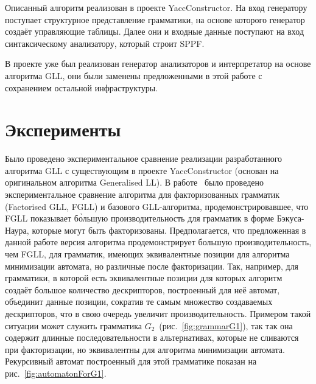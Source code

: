 \documentclass[14pt]{matmex-diploma-custom}
\begin{document}
    Описанный алгоритм реализован в проекте YaccConstructor. 
    На вход генератору поступает структурное представление грамматики, на основе которого 
    генератор создаёт управляющие таблицы. Далее они и входные данные поступают на вход
    синтаксическому анализатору, который строит SPPF. 
    
    В проекте уже был реализован генератор анализаторов и интерпретатор
    на основе алгоритма GLL, они были заменены предложенными в этой работе с сохранением остальной инфраструктуры.

	\section{Эксперименты}
    Было проведено экспериментальное сравнение реализации разработанного алгоритма GLL с
    существующим в проекте YaccConstructor (основан на оригинальном алгоритма Generalised LL). В работе~\cite{scott2016structuring}
    было проведено экспериментальное сравнение алгоритма для факторизованных грамматик (Factorised GLL, FGLL) и базового GLL-алгоритма,
    продемонстрировавшее, что FGLL показывает б\`ольшую производительность для грамматик в форме Бэкуса-Наура, которые могут быть факторизованы.
    Предполагается, что предложенная в данной работе версия алгоритма
    продемонстрирует большую производительность, чем FGLL, для грамматик, имеющих эквивалентные позиции для алгоритма минимизации автомата, но различные после факторизации. Так, например, для грамматики, в которой есть эквивалентные позиции для которых алгоритм создаёт большое количество дескрипторов,
    построенный для неё автомат, объединит данные позиции, сократив те самым множество создаваемых дескрипторов,
    что в свою очередь увеличит производительность. Примером такой ситуации может служить грамматика 
    $G_2$~(рис.~\ref{fig:grammarG1}), так так она содержит длинные последовательности 
    в альтернативах, которые не сливаются при факторизации, но эквивалентны для алгоритма минимизации автомата.
    Рекурсивный автомат построенный для этой грамматике показан на рис.~\ref{fig:automatonForG1}.
    
\end{document}
